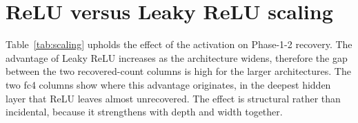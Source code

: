 \documentclass[runningheads,orivec]{llncs}
\begin{document}
\begin{table}[H]
\centering
\caption{Pipeline parameters held fixed across all victims. Both activations share
these settings; only \texttt{LEAKY\_ALPHA} distinguishes the ReLU and Leaky ReLU runs.}
\label{tab:params-shared}
\setlength{\tabcolsep}{3pt}\small
{}
\end{table}

\section{ReLU versus Leaky ReLU scaling}
\label{app:exp:scaling}
Table~\ref{tab:scaling} upholds the effect of the activation on Phase-1-2 recovery. The advantage of Leaky ReLU increases as the architecture widens, therefore the gap between the two recovered-count columns is high for the larger architectures. The two fc4 columns show where this advantage originates, in the deepest hidden layer that ReLU leaves almost unrecovered. The effect is structural rather than incidental, because it strengthens with depth and width together.
\end{document}
